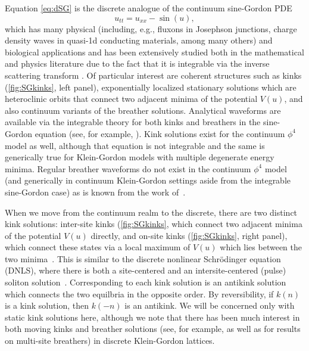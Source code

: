 \documentclass[12pt,reqno]{amsart}
\begin{document}
Equation \cref{eq:dSG} is the discrete analogue of the 
continuum sine-Gordon PDE
\begin{equation}\label{eq:dKG}
	u_{tt} = u_{xx} - \sin(u),
\end{equation}
which has many physical (including, e.g.,
fluxons in Josephson junctions, charge density
waves in quasi-1d conducting materials, among many others)
and biological applications \cites{SGbook,Ivancevic2013} and has been extensively studied both in the mathematical and physics literature due to the fact that it is integrable via the inverse scattering transform \cite{SolitonBook1}. Of particular interest are coherent structures such as kinks (\cref{fig:SGkinks}, left panel), exponentially localized stationary solutions which 
are heteroclinic orbits that connect two adjacent minima of the potential $V(u)$, and also continuum variants of the breather
solutions. Analytical waveforms are available via the 
integrable theory for both kinks and breathers in the sine-Gordon equation (see, for example, \cite{SGchapter}). Kink  solutions exist for the continuum $\phi^4$ model as well, although that equation is not integrable \cites{SGbook,KevrekidisWeinstein2000}
and the same is generically true for Klein-Gordon
models
with multiple degenerate energy minima.
Regular breather waveforms do not exist
in the continuum $\phi^4$ model (and generically in continuum
Klein-Gordon settings aside from the integrable
sine-Gordon case) as is known from the work of~\cite{segur}. 

When we move from the continuum realm to the discrete, there are two distinct kink solutions: inter-site kinks (\cref{fig:SGkinks}, which connect two adjacent minima of the potential $V(u)$ directly, and on-site kinks (\cref{fig:SGkinks}, right panel), which connect these states via a local maximum of $V(u)$ which lies between the two minima~\cite{peyrard}. This is similar to the discrete nonlinear Schr{\"o}dinger equation (DNLS), where there is both a site-centered and an intersite-centered (pulse) soliton solution~\cite{Kevrekidis2009}. Corresponding to each kink solution is an antikink solution which connects the two equilbria in the opposite order. By reversibility, if $k(n)$ is a kink solution, then $k(-n)$ is an antikink. We will be concerned only with static kink solutions here, although we note that there has been much interest in both moving kinks \cites{Aigner2003,Iooss2006,Cisneros2008} and breather solutions (see, for example, \cites{SGbook} as well as \cites{Pelinovsky2012,Cuevas2011} for results on multi-site breathers) in discrete Klein-Gordon lattices.
\end{document}
